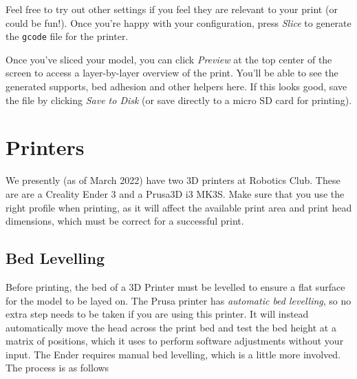 \documentclass[12pt]{report}
\begin{document}
Feel free to try out other settings if you feel they are relevant to your print
(or could be fun!). Once you're happy with your configuration, press
\textit{Slice} to generate the \texttt{gcode} file for the printer. \par
Once you've sliced your model, you can click \textit{Preview} at the top center
of the screen to access a layer-by-layer overview of the print. You'll be able
to see the generated supports, bed adhesion and other helpers here. If this
looks good, save the file by clicking \textit{Save to Disk} (or save directly
to a micro SD card for printing).

\pagebreak
\section*{Printers}
\label{sec:printers}

We presently (as of March 2022) have two 3D printers at Robotics Club. These are
are a Creality Ender 3 and a Prusa3D i3 MK3S. Make sure that you use the right
profile when printing, as it will affect the available print area and print head
dimensions, which must be correct for a successful print.

\subsection*{Bed Levelling}
\label{sec:levelling}

Before printing, the bed of a 3D Printer must be levelled to ensure a flat
surface for the model to be layed on. The Prusa printer has \textit{automatic
bed levelling}, so no extra step needs to be taken if you are using this
printer. It will instead automatically move the head across the print bed and
test the bed height at a matrix of positions, which it uses to perform software
adjustments without your input. The Ender requires manual bed levelling, which
is a little more involved. The process is as follows
\end{document}
